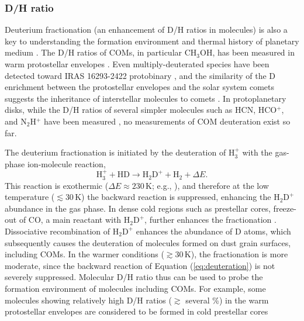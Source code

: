 \documentclass[twocolumn, twocolappendix, astrosymb, times]{aastex631}
\newcommand{\methanol}{CH$_3$OH\xspace}
\begin{document}
\subsubsection{D/H ratio}
Deuterium fractionation (an enhancement of D/H ratios in molecules) is also a key to understanding the formation environment and thermal history of planetary medium \citep[e.g.,][]{Ceccarelli2014, Nomura2023_PPVII}. The D/H ratios of COMs, in particular \methanol, has been measured in warm protostellar envelopes \citep[e.g.,][]{Jorgensen2018, Drozdovskaya2021}. Even multiply-deuterated species have been detected toward IRAS 16293-2422 protobinary \citep[e.g.,][]{Manigand2019, Richard2021, Drozdovskaya2022}, and the similarity of the D enrichment between the protostellar envelopes and the solar system comets suggests the inheritance of interstellar molecules to comets \citep{Drozdovskaya2021}. In protoplanetary disks, while the D/H ratios of several simpler molecules such as HCN, HCO$^{+}$, and N$_2$H$^{+}$ have been measured \citep[e.g.,][see also \citealt{Aikawa2022}]{Cataldi2021}, no measurements of COM deuteration exist so far. 


The deuterium fractionation is initiated by the deuteration of $\mathrm{H_3^+}$ with the gas-phase ion-molecule reaction, 
\begin{equation}\label{eq:deuteration}
    \mathrm{H}_3^+ + \mathrm{HD} \rightarrow \mathrm{H_2D^+} + \mathrm{H_2} + \Delta E.
\end{equation}
This reaction is exothermic ($\Delta E \approx 230$\,K; e.g., \citealt{Millar1989}), and therefore at the low temperature ($\lesssim 30$\,K) the backward reaction is suppressed, enhancing the $\mathrm{H_2D^+}$ abundance in the gas phase. In dense cold regions such as prestellar cores, freeze-out of CO, a main reactant with $\mathrm{H_2D^+}$, further enhances the fractionation \citep[e.g.,][]{Roberts2000}. Dissociative recombination of $\mathrm{H_2D^+}$ enhances the abundance of D atoms, which subsequently causes the deuteration of molecules formed on dust grain surfaces, including COMs. In the warmer conditions ($\gtrsim 30$\,K), the fractionation is more moderate, since the backward reaction of Equation (\ref{eq:deuteration}) is not severely suppressed. Molecular D/H ratio thus can be used to probe the formation environment of molecules including COMs. For example, some molecules showing relatively high D/H ratios ($\gtrsim$ several \%) in the warm protostellar envelopes are considered to be formed in cold prestellar cores \citep[e.g.,][]{Jorgensen2018, Yamato2022}
\end{document}
